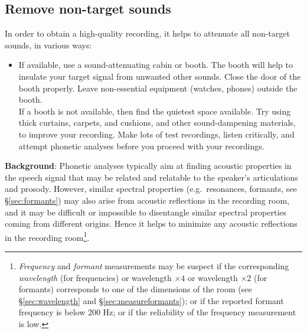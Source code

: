 \documentclass[
]{book}
\providecommand{\tightlist}{%
  \setlength{\itemsep}{0pt}\setlength{\parskip}{0pt}}
\begin{document}
\subsection{Remove non-target sounds}\label{sec:removenontargetsounds}

In order to obtain a high-quality recording, it helps to attenuate all non-target sounds, in various ways:

\begin{itemize}
\tightlist
\item
  If available, use a sound-attenuating cabin or booth. The booth will help to insulate your target signal from unwanted other sounds. Close the door of the booth properly. Leave non-essential equipment (watches, phones) outside the booth.\\
  If a booth is not available, then find the quietest space available. Try using thick curtains, carpets, and cushions, and other sound-dampening materials, to improve your recording. Make lots of test recordings, listen critically, and attempt phonetic analyses before you proceed with your recordings.
\end{itemize}

\textbf{Background}: Phonetic analyses typically aim at finding acoustic properties in the speech signal that may be related and relatable to the speaker's articulations and prosody. However, similar spectral properties (e.g.~resonances, formants, see §\ref{sec:formants}) may also arise from acoustic reflections in the recording room, and it may be difficult or impossible to disentangle similar spectral properties coming from different origins. Hence it helps to minimize any acoustic reflections in the recording room\footnote{\emph{Frequency} and \emph{formant} measurements may be suspect if the corresponding \emph{wavelength} (for frequencies) or wavelength \(\times 4\) or wavelength \(\times 2\) (for formants) corresponds to one of the dimensions of the room (see §\ref{sec:wavelength} and §\ref{sec:measureformants}); or if the reported formant frequency is below 200 Hz; or if the reliability of the frequency measurement is low.}.
\end{document}
